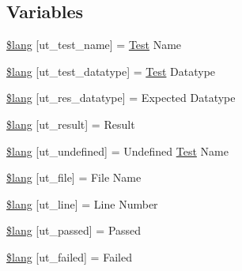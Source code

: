 \subsection*{Variables}
\begin{DoxyCompactItemize}
\item 
\mbox{\hyperlink{unit__test__lang_8php_a81799dc131f89840fd4ff4bc7c0afc94}{\$lang}} \mbox{[}\textquotesingle{}ut\+\_\+test\+\_\+name\textquotesingle{}\mbox{]} = \textquotesingle{}\mbox{\hyperlink{class_test}{Test}} Name\textquotesingle{}
\item 
\mbox{\hyperlink{unit__test__lang_8php_a301df10bea29df793be5796e34235e6a}{\$lang}} \mbox{[}\textquotesingle{}ut\+\_\+test\+\_\+datatype\textquotesingle{}\mbox{]} = \textquotesingle{}\mbox{\hyperlink{class_test}{Test}} Datatype\textquotesingle{}
\item 
\mbox{\hyperlink{unit__test__lang_8php_a437ee3cbc146427c03253f7571d09b03}{\$lang}} \mbox{[}\textquotesingle{}ut\+\_\+res\+\_\+datatype\textquotesingle{}\mbox{]} = \textquotesingle{}Expected Datatype\textquotesingle{}
\item 
\mbox{\hyperlink{unit__test__lang_8php_ab1ff13146001ad003f4d92e3fb4b1190}{\$lang}} \mbox{[}\textquotesingle{}ut\+\_\+result\textquotesingle{}\mbox{]} = \textquotesingle{}Result\textquotesingle{}
\item 
\mbox{\hyperlink{unit__test__lang_8php_a52ad90213a43a5add5c6bf03f42b0e8f}{\$lang}} \mbox{[}\textquotesingle{}ut\+\_\+undefined\textquotesingle{}\mbox{]} = \textquotesingle{}Undefined \mbox{\hyperlink{class_test}{Test}} Name\textquotesingle{}
\item 
\mbox{\hyperlink{unit__test__lang_8php_acf2db8df5259159b1df4d2c44671187c}{\$lang}} \mbox{[}\textquotesingle{}ut\+\_\+file\textquotesingle{}\mbox{]} = \textquotesingle{}File Name\textquotesingle{}
\item 
\mbox{\hyperlink{unit__test__lang_8php_adee2247694b7dc04e6881f736c6c4dff}{\$lang}} \mbox{[}\textquotesingle{}ut\+\_\+line\textquotesingle{}\mbox{]} = \textquotesingle{}Line Number\textquotesingle{}
\item 
\mbox{\hyperlink{unit__test__lang_8php_a4b08dcf29886acf8206412a4cc3d21ea}{\$lang}} \mbox{[}\textquotesingle{}ut\+\_\+passed\textquotesingle{}\mbox{]} = \textquotesingle{}Passed\textquotesingle{}
\item 
\mbox{\hyperlink{unit__test__lang_8php_ab781daff8ab023276b6460620725f16b}{\$lang}} \mbox{[}\textquotesingle{}ut\+\_\+failed\textquotesingle{}\mbox{]} = \textquotesingle{}Failed\textquotesingle{}
\item 

\end{DoxyCompactItemize}
